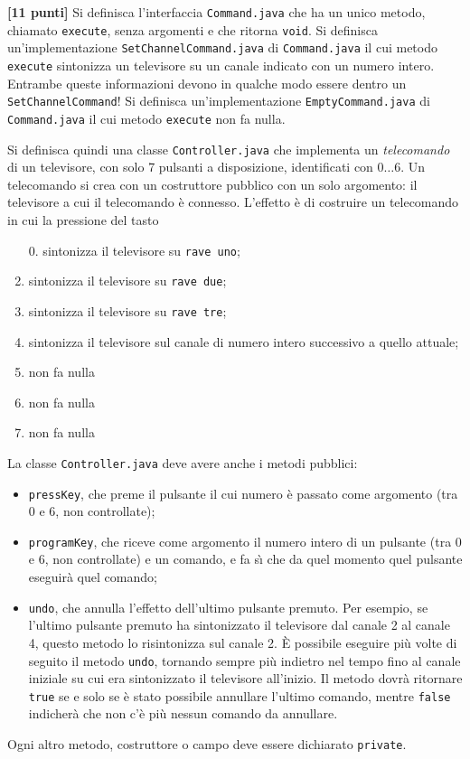 \documentclass{article}[10pt]
\newcounter{esnu}
\newenvironment{esercizio}{\medskip \noindent {\bf Esercizio\addtocounter{esnu}{1} \arabic{esnu}}}{}
\begin{document}
\begin{esercizio}
\textbf{[11 punti]} Si definisca l'interfaccia \texttt{Command.java} che ha un unico metodo, chiamato
\texttt{execute}, senza argomenti e che ritorna \texttt{void}.
Si definisca un'implementazione
\texttt{SetChannelCommand.java} di \texttt{Command.java} il cui metodo \texttt{execute}
sintonizza un televisore su
un canale indicato con un numero intero. Entrambe queste informazioni devono in qualche
modo essere dentro un \texttt{SetChannelCommand}!
Si definisca un'implementazione
\texttt{EmptyCommand.java} di \texttt{Command.java} il cui metodo \texttt{execute}
non fa nulla.

Si definisca quindi una classe \texttt{Controller.java} che implementa un \emph{telecomando}
di un televisore, con solo 7 pulsanti a disposizione, identificati con $0\ldots 6$.
Un telecomando si crea con un costruttore
pubblico con un solo argomento: il televisore a cui il telecomando \`e connesso.
L'effetto \`e di costruire un telecomando in cui la pressione del tasto
%
\begin{enumerate}
\item[0.] sintonizza il televisore su \texttt{rave uno};
\item sintonizza il televisore su \texttt{rave due};
\item sintonizza il televisore su \texttt{rave tre};
\item sintonizza il televisore sul canale di numero intero successivo a quello attuale;
\item non fa nulla
\item non fa nulla
\item non fa nulla
\end{enumerate}
%
La classe \texttt{Controller.java} deve avere anche i metodi pubblici:
%
\begin{itemize}
\item \texttt{pressKey}, che preme il pulsante il cui numero \`e passato come
      argomento (tra 0 e 6, non controllate);
\item \texttt{programKey}, che riceve come argomento il numero intero di un pulsante
      (tra 0 e 6, non controllate) e un comando, e fa s\`{\i} che da quel momento
      quel pulsante eseguir\`a quel comando;
\item \texttt{undo}, che annulla l'effetto dell'ultimo pulsante premuto. Per esempio,
      se l'ultimo pulsante premuto ha sintonizzato il televisore dal canale 2 al canale 4,
      questo metodo lo risintonizza sul canale 2. \`E possibile eseguire pi\`u volte di seguito
      il metodo \texttt{undo}, tornando sempre pi\`u indietro nel tempo fino al canale
      iniziale su cui era sintonizzato il televisore all'inizio. Il metodo dovr\`a ritornare
      \texttt{true} se e solo se \`e stato possibile annullare l'ultimo comando, mentre
      \texttt{false} indicher\`a che non c'\`e pi\`u nessun comando da annullare.
\end{itemize}
%
Ogni altro metodo, costruttore o campo deve essere dichiarato \texttt{private}.


\end{esercizio}
\end{document}

